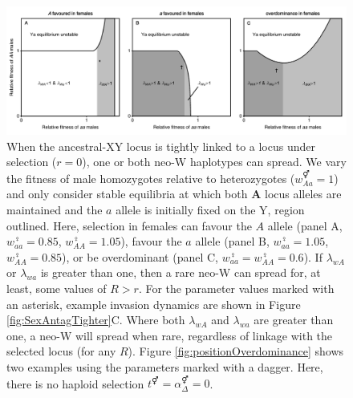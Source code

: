 \documentclass[12pt]{article}
\begin{document}
\begin{figure}[!h]
\centering
\centerline{\includegraphics[width=1.25\linewidth]{Region_plot_combined}}
\caption{
When the ancestral-XY locus is tightly linked to a locus under selection ($r=0$), one or both neo-W haplotypes can spread. 
We vary the fitness of male homozygotes relative to heterozygotes ($w_{Aa}^\Hermaphrodite=1$) and only consider stable equilibria at which both \textbf{A} locus alleles are maintained and the $a$ allele is initially fixed on the Y, region outlined. 
Here, selection in females can favour the $A$ allele (panel A, $w_{aa}^\female=0.85$, $w_{AA}^\female=1.05$), favour the $a$ allele (panel B, $w_{aa}^\female=1.05$, $w_{AA}^\female=0.85$), or be overdominant (panel C, $w_{aa}^\female=w_{AA}^\female=0.6$). 
If $\lambda_{wA}$ or $\lambda_{wa}$ is greater than one, then a rare neo-W can spread for, at least, some values of $R>r$. 
For the parameter values marked with an asterisk, example invasion dynamics are shown in Figure \ref{fig:SexAntagTighter}C. 
Where both $\lambda_{wA}$ and $\lambda_{wa}$ are greater than one, a neo-W will spread when rare, regardless of linkage with the selected locus (for any $R$). 
Figure \ref{fig:positionOverdominance} shows two examples using the parameters marked with a dagger. 
Here, there is no haploid selection $t^\Hermaphrodite = \alpha^\Hermaphrodite_\Delta = 0$.
}
\label{fig:regionplots}
\end{figure}


\end{document}
